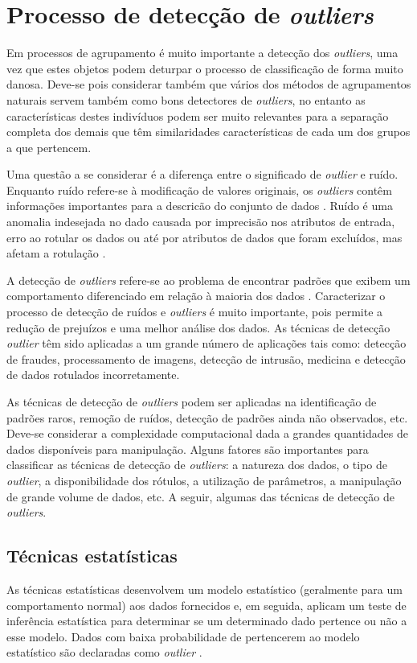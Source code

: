 \section{Processo de detecção de \textit{outliers}}

Em processos de agrupamento é muito importante a detecção dos \textit{outliers}, uma vez que estes objetos podem deturpar o processo de classificação de forma muito danosa. Deve-se pois considerar também que vários dos métodos de agrupamentos naturais servem também como bons detectores de \textit{outliers}, no entanto as características destes indivíduos podem ser muito relevantes para a separação completa dos demais que têm similaridades características de cada um dos grupos a que pertencem.

Uma questão a se considerar é a diferença entre o significado de \textit{outlier} e ruído. Enquanto ruído refere-se à modificação de valores originais, os \textit{outliers} contêm informações importantes para a descricão do conjunto de dados \cite{chandola2009}. Ruído é uma anomalia indesejada no dado causada por imprecisão nos atributos de entrada, erro ao rotular os dados ou até por atributos de dados que foram excluídos, mas afetam a rotulação \cite{alpaydin2010}.

A detecção de \textit{outliers} refere-se ao problema de encontrar padrões que exibem um comportamento diferenciado em relação à maioria dos dados \cite{chandola2009}. Caracterizar o processo de detecção de ruídos e \textit{outliers} é muito importante, pois permite a redução de prejuízos e uma melhor análise dos dados. As técnicas de detecção \textit{outlier} têm sido aplicadas a um grande número de aplicações tais como: detecção de fraudes, processamento de imagens, detecção de intrusão, medicina e detecção de dados rotulados incorretamente.

As técnicas de detecção de \textit{outliers} podem ser aplicadas na identificação de padrões raros, remoção de ruídos, detecção de padrões ainda não observados, etc. Deve-se considerar a complexidade computacional dada a grandes quantidades de dados disponíveis para manipulação. Alguns fatores são importantes para classificar as técnicas de detecção de \textit{outliers}: a natureza dos dados, o tipo de \textit{outlier}, a disponibilidade dos rótulos, a utilização de parâmetros, a manipulação de grande volume de dados, etc. A seguir, algumas das técnicas de detecção de \textit{outliers}.

\subsection{Técnicas estatísticas}
As técnicas estatísticas desenvolvem um modelo estatístico (geralmente para um comportamento normal) aos dados fornecidos e, em seguida, aplicam um teste de inferência estatística para determinar se um determinado dado pertence ou não a esse modelo. Dados com baixa probabilidade de pertencerem ao modelo estatístico são declaradas como \textit{outlier} \cite{chandola2009}.

